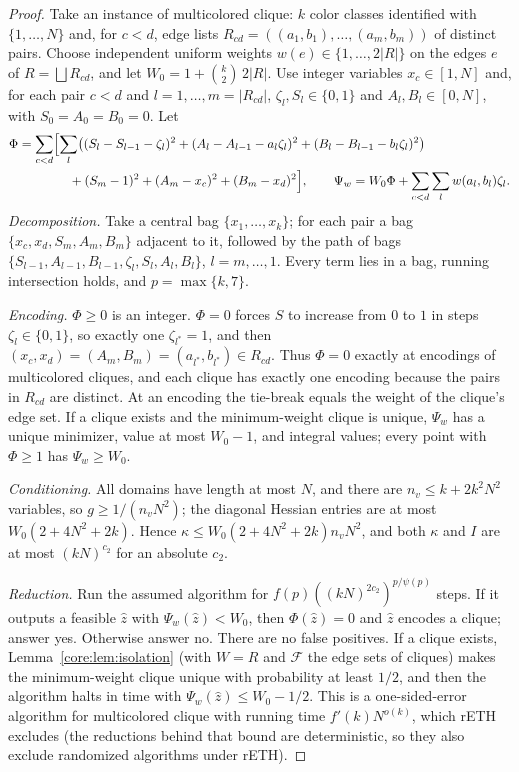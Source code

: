 \begin{proof}
Take an instance of multicolored clique: $k$ color classes identified with
$\{1,\dots,N\}$ and, for $c<d$, edge lists
$R_{cd}=((a_1,b_1),\dots,(a_m,b_m))$ of distinct pairs. Choose independent
uniform weights $w(e)\in\{1,\dots,2|R|\}$ on the edges $e$ of
$R=\bigsqcup R_{cd}$, and let $W_0=1+\binom k2\,2|R|$. Use integer variables
$x_c\in[1,N]$ and, for each pair $c<d$ and $l=1,\dots,m=|R_{cd}|$,
$\zeta_l,S_l\in\{0,1\}$ and $A_l,B_l\in[0,N]$, with $S_0=A_0=B_0=0$. Let
\begin{align*}
\Phi&=\sum_{c<d}\Bigl[\sum_{l}\bigl((S_l-S_{l-1}-\zeta_l)^2
+(A_l-A_{l-1}-a_l\zeta_l)^2+(B_l-B_{l-1}-b_l\zeta_l)^2\bigr)\\
&\qquad\qquad+(S_m-1)^2+(A_m-x_c)^2+(B_m-x_d)^2\Bigr],\qquad
\Psi_w=W_0\Phi+\sum_{c<d}\sum_lw(a_l,b_l)\zeta_l .
\end{align*}
\emph{Decomposition.} Take a central bag $\{x_1,\dots,x_k\}$; for each pair a
bag $\{x_c,x_d,S_m,A_m,B_m\}$ adjacent to it, followed by the path of bags
$\{S_{l-1},A_{l-1},B_{l-1},\zeta_l,S_l,A_l,B_l\}$, $l=m,\dots,1$. Every term
lies in a bag, running intersection holds, and $p=\max\{k,7\}$.

\emph{Encoding.} $\Phi\ge0$ is an integer. $\Phi=0$ forces $S$ to increase
from $0$ to $1$ in steps $\zeta_l\in\{0,1\}$, so exactly one $\zeta_{l^*}=1$,
and then $(x_c,x_d)=(A_m,B_m)=(a_{l^*},b_{l^*})\in R_{cd}$. Thus $\Phi=0$
exactly at encodings of multicolored cliques, and each clique has exactly one
encoding because the pairs in $R_{cd}$ are distinct. At an encoding the
tie-break equals the weight of the clique's edge set. If a clique exists and
the minimum-weight clique is unique, $\Psi_w$ has a unique minimizer, value at
most $W_0-1$, and integral values; every point with $\Phi\ge1$ has
$\Psi_w\ge W_0$.

\emph{Conditioning.} All domains have length at most $N$, and there are
$n_v\le k+2k^2N^2$ variables, so $g\ge1/(n_vN^2)$; the diagonal Hessian entries
are at most $W_0(2+4N^2+2k)$. Hence $\kappa\le W_0(2+4N^2+2k)n_vN^2$, and both
$\kappa$ and $I$ are at most $(kN)^{c_2}$ for an absolute $c_2$.

\emph{Reduction.} Run the assumed algorithm for
$f(p)((kN)^{2c_2})^{p/\psi(p)}$ steps. If it outputs a feasible $\hat z$ with
$\Psi_w(\hat z)<W_0$, then $\Phi(\hat z)=0$ and $\hat z$ encodes a clique; answer
yes. Otherwise answer no. There are no false positives. If a clique exists,
Lemma~\ref{core:lem:isolation} (with $W=R$ and $\mathcal F$ the edge sets of
cliques) makes the minimum-weight clique unique with probability at least
$1/2$, and then the algorithm halts in time with $\Psi_w(\hat z)\le W_0-1/2$.
This is a one-sided-error algorithm for multicolored clique with running time
$f'(k)N^{o(k)}$, which rETH excludes \cite{ChenEtAl2006} (the reductions
behind that bound are deterministic, so they also exclude randomized
algorithms under rETH).
\end{proof}

